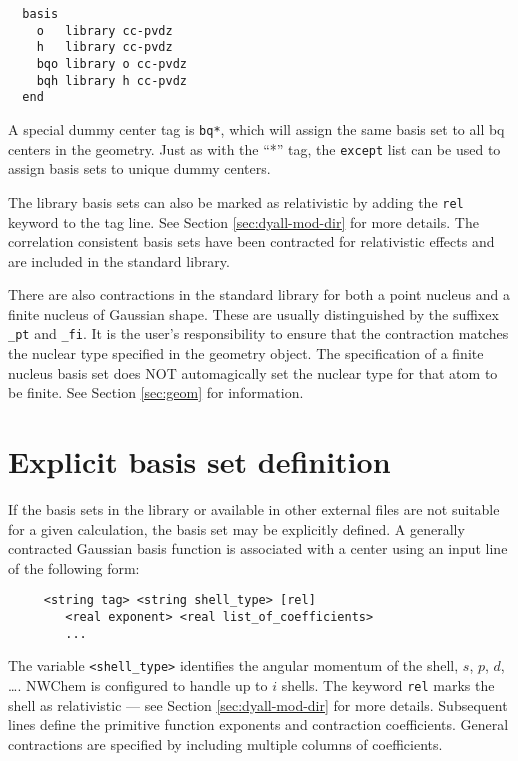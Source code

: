 \begin{verbatim}
  basis
    o   library cc-pvdz
    h   library cc-pvdz
    bqo library o cc-pvdz
    bqh library h cc-pvdz
  end
\end{verbatim}
A special dummy center tag is \verb+bq*+, which will assign the same basis 
set to all bq centers in the geometry. Just as with the ``*'' tag, the 
\verb+except+ list can be used to assign basis sets to unique dummy centers.

The library basis sets can also be marked as relativistic by adding the
\verb+rel+ keyword to the tag line. See Section \ref{sec:dyall-mod-dir} for
more details. The correlation consistent basis sets have been contracted for
relativistic effects and are included in the standard library.

There are also contractions in the standard library for both a point nucleus
and a finite nucleus of Gaussian shape. These are usually distinguished by
the suffixex {\tt \_pt} and {\tt \_fi}. It is the user's responsibility to
ensure that the contraction matches the nuclear type specified in the
geometry object. The specification of a finite nucleus basis set does NOT
automagically set the nuclear type for that atom to be finite.  See 
Section \ref{sec:geom} for information.

\section{Explicit basis set definition}

If the basis sets in the library or available in other external files
are not suitable for a given calculation, 
the basis set may be explicitly defined.
A generally contracted Gaussian basis function is associated with a
center using an input line of the following form:
\begin{verbatim}
     <string tag> <string shell_type> [rel]
        <real exponent> <real list_of_coefficients>
        ...
\end{verbatim}

The variable \verb+<shell_type>+ identifies the angular momentum of the
shell, $s$, $p$, $d$, \ldots.  NWChem is configured to handle up to $i$
shells.  The keyword \verb+rel+ marks the shell as relativistic --- see
Section \ref{sec:dyall-mod-dir} for more details.  Subsequent lines define
the primitive function exponents and contraction coefficients.  General
contractions are specified by including multiple columns of coefficients.


